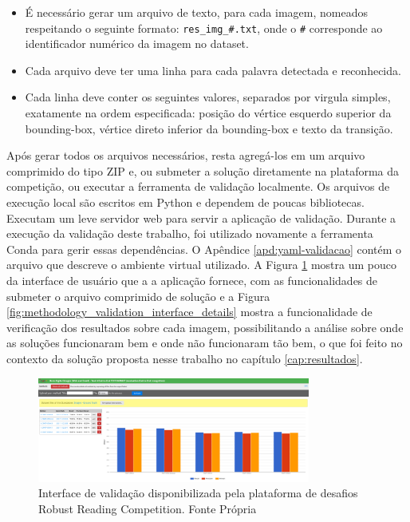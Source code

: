 \begin{itemize}
    \item É necessário gerar um arquivo de texto, para cada imagem, nomeados respeitando o seguinte formato: \texttt{res\_img\_\#.txt}, onde o \texttt{\#} corresponde ao identificador numérico da imagem no dataset.
    \item Cada arquivo deve ter uma linha para cada palavra detectada e reconhecida.
    \item Cada linha deve conter os seguintes valores, separados por virgula simples, exatamente na ordem especificada: posição do vértice esquerdo superior da bounding-box, vértice direto inferior da bounding-box e texto da transição.
\end{itemize}

Após gerar todos os arquivos necessários, resta agregá-los em um arquivo comprimido do tipo ZIP e, ou submeter a solução diretamente na plataforma da competição, ou executar a ferramenta de validação localmente. Os arquivos de execução local são escritos em Python e dependem de poucas bibliotecas. Executam um leve servidor web para servir a aplicação de validação. Durante a execução da validação deste trabalho, foi utilizado novamente a ferramenta Conda para gerir essas dependências. O Apêndice \ref{apd:yaml-validacao} contém o arquivo que descreve o ambiente virtual utilizado. A Figura \ref{fig:methodology_validation_interface} mostra um pouco da interface de usuário que a a aplicação fornece, com as funcionalidades de submeter o arquivo comprimido de solução e a Figura \ref{fig:methodology_validation_interface_details} mostra a funcionalidade de verificação dos resultados sobre cada imagem, possibilitando a análise sobre onde as soluções funcionaram bem e onde não funcionaram tão bem, o que foi feito no contexto da solução proposta nesse trabalho no capítulo \ref{cap:resultados}.

\begin{figure}
    \centering
    \includegraphics[width=0.8\textwidth]{figs/metodologia-interface-validacao.png}
    \caption{Interface de validação disponibilizada pela plataforma de desafios Robust Reading Competition. Fonte Própria}
    \label{fig:methodology_validation_interface}
\end{figure}

